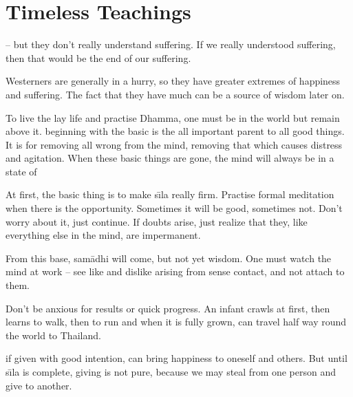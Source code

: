 
\chapter{Timeless Teachings}

 -- but they don't really understand suffering. If we really understood suffering, then that would be the end of our suffering.

Westerners are generally in a hurry, so they have greater extremes of happiness and suffering. The fact that they have much  can be a source of wisdom later on.

To live the lay life and practise Dhamma, one must be in the world but remain above it.  beginning with the basic  is the all important parent to all good things. It is for removing all wrong from the mind, removing that which causes distress and agitation. When these basic things are gone, the mind will always be in a state of 

At first, the basic thing is to make s\={\i}la really firm. Practise formal meditation when there is the opportunity. Sometimes it will be good, sometimes not. Don't worry about it, just continue. If doubts arise, just realize that they, like everything else in the mind, are impermanent.

From this base, sam\=adhi will come, but not yet wisdom. One must watch the mind at work -- see like and dislike arising from sense contact, and not attach to them.

Don't be anxious for results or quick progress. An infant crawls at first, then learns to walk, then to run and when it is fully grown, can travel half way round the world to Thailand.

 if given with good intention, can bring happiness to oneself and others. But until s\={\i}la is complete, giving is not pure, because we may steal from one person and give to another.

